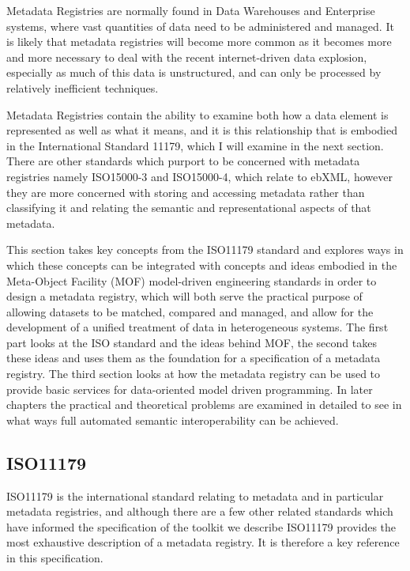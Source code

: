 Metadata Registries are normally found in Data Warehouses and Enterprise systems, where vast quantities of data need to be administered and managed. It is likely that metadata registries will become more common as it becomes more and more necessary to deal with the recent internet-driven data explosion, especially as much of this data is unstructured, and can only be processed by relatively inefficient techniques.

Metadata Registries contain the ability to examine both how a data element is represented as well as what it means, and it is this relationship that is embodied in the International Standard 11179, which I will examine in the next section. There are other standards which purport to be concerned with metadata registries namely ISO15000-3 and ISO15000-4, which relate to ebXML, however they are more concerned with storing and accessing metadata rather than classifying it and relating the semantic and representational aspects of that metadata.

This section takes key concepts from the ISO11179 standard and explores ways in which these concepts can be integrated with concepts and ideas embodied in the Meta-Object Facility (MOF) model-driven engineering standards in order to design a metadata registry, which will both serve the practical purpose of allowing datasets to be matched, compared and managed, and allow for the development of a unified treatment of data in heterogeneous systems. The first part looks at the ISO standard and the ideas behind MOF, the second takes these ideas and uses them as the foundation for a specification of a metadata registry. The third section looks at how the metadata registry can be used to provide basic services for data-oriented model driven programming. In later chapters the practical and theoretical problems are examined in detailed to see in what ways full automated semantic interoperability can be achieved.


\subsection{ISO11179}
ISO11179 is the international standard relating to metadata and in particular metadata registries, and although there are a few other related standards which have informed the specification of the toolkit we describe ISO11179 provides the most exhaustive description of a metadata registry. It is therefore a key reference in this specification.




